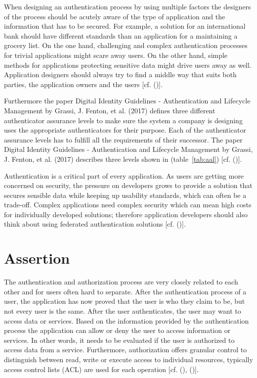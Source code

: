 When designing an authentication process by using multiple factors the designers of the process should be acutely aware of the type of application and the information that has to be secured. For example, a solution for an international bank should have different standards than an application for a maintaining a grocery list. On the one hand, challenging and complex authentication processes for trivial applications might scare away users. On the other hand, simple methods for applications protecting sensitive data might drive users away as well. Application designers should always try to find a middle way that suits both parties, the application owners and the users [cf. (\cite{NIST:2017:DIG})]. 

Furthermore the paper Digital Identity Guidelines - Authentication and Lifecycle Management by Grassi, J. Fenton, et al. (2017) defines three different authenticator assurance levels to make sure the system a company is designing uses the appropriate authenticators for their purpose. Each of the authenticator assurance levels has to fulfill all the requirements of their successor. The paper Digital Identity Guidelines - Authentication and Lifecycle Management by  Grassi, J. Fenton, et al. (2017) describes three levels shown in (table~\ref{tab:aal}) [cf. (\cite{NIST:2017:DIGAL})].

Authentication is a critical part of every application. As users are getting more concerned on security, the pressure on developers grows to provide a solution that secures sensible data while keeping up usability standards, which can often be a trade-off. Complex applications need complex security which can mean high costs for individually developed solutions; therefore application developers should also think about using federated authentication solutions [cf. (\cite{NIST:2017:DIGAL})].


\section{Assertion}
\label{assertion}
The authentication and authorization process are very closely related to each other and for users often hard to separate. After the authentication process of a user, the application has now proved that the user is who they claim to be, but not every user is the same. After the user authenticates, the user may want to access data or services. Based on the information provided by the authentication process the application can allow or deny the user to access information or services. In other words, it needs to be evaluated if the user is authorized to access data from a service. Furthermore, authorization offers granular control to distinguish between read, write or execute access to individual resources, typically access control lists (ACL) are used for each operation [cf. (\cite{Todorov:2007:MUI}), (\cite{Boyed:2012:GSOA})].

